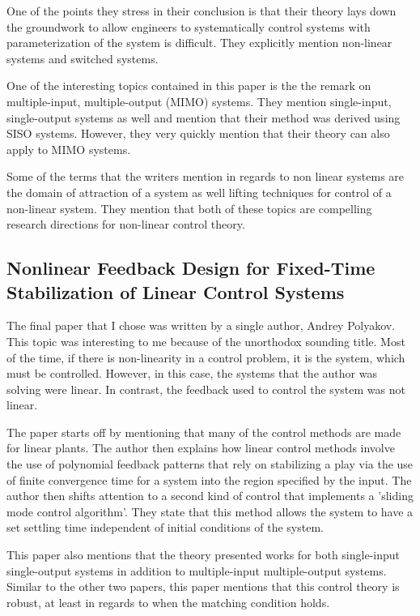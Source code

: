 \documentclass{IEEEtran}
\begin{document}
One of the points they stress in their conclusion is that their theory lays down the groundwork to allow engineers to systematically control systems with parameterization of the system is difficult. They explicitly mention non-linear systems and switched systems.

One of the interesting topics contained in this paper is the the remark on multiple-input, multiple-output (MIMO) systems. They mention single-input, single-output systems as well and mention that their method was derived using SISO systems. However, they very quickly mention that their theory can also apply to MIMO systems.

Some of the terms that the writers mention in regards to non linear systems are the domain of attraction of a system as well lifting techniques for control of a non-linear system. They mention that both of these topics are compelling research directions for non-linear control theory.



\subsection{Nonlinear Feedback Design for Fixed-Time Stabilization of Linear Control Systems}

The final paper \cite{6104367} that I chose was written by a single author, Andrey Polyakov. This topic was interesting to me because of the unorthodox sounding title. Most of the time, if there is non-linearity in a control problem, it is the system, which must be controlled. However, in this case, the systems that the author was solving were linear. In contrast, the feedback used to control the system was not linear.

The paper starts off by mentioning that many of the control methods are made for linear plants. The author then explains how linear control methods involve the use of polynomial feedback patterns that rely on stabilizing a play via the use of finite convergence time for a system into the region specified by the input. The author then shifts attention to a second kind of control that implements a 'sliding mode control algorithm'. They state that this method allows the system to have a set settling time independent of initial conditions of the system.

This paper also mentions that the theory presented works for both single-input single-output systems in addition to multiple-input multiple-output systems. Similar to the other two papers, this paper mentions that this control theory is robust, at least in regards to when the matching condition holds.
\end{document}
